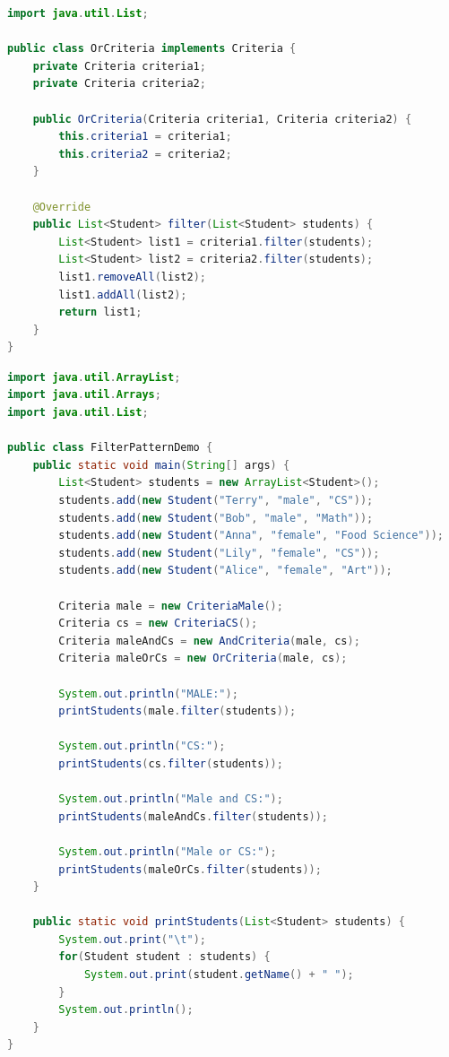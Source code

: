 \begin{lstlisting}[language=Java, title=OrCriteria.java]
import java.util.List;

public class OrCriteria implements Criteria {
    private Criteria criteria1;
    private Criteria criteria2;

    public OrCriteria(Criteria criteria1, Criteria criteria2) {
        this.criteria1 = criteria1;
        this.criteria2 = criteria2;
    }

    @Override
    public List<Student> filter(List<Student> students) {
        List<Student> list1 = criteria1.filter(students);
        List<Student> list2 = criteria2.filter(students);
        list1.removeAll(list2);
        list1.addAll(list2);
        return list1;
    }
}
\end{lstlisting}

\begin{lstlisting}[language=Java, title=FilterPatternDemo.java]
import java.util.ArrayList;
import java.util.Arrays;
import java.util.List;

public class FilterPatternDemo {
    public static void main(String[] args) {
        List<Student> students = new ArrayList<Student>();
        students.add(new Student("Terry", "male", "CS"));
        students.add(new Student("Bob", "male", "Math"));
        students.add(new Student("Anna", "female", "Food Science"));
        students.add(new Student("Lily", "female", "CS"));
        students.add(new Student("Alice", "female", "Art"));

        Criteria male = new CriteriaMale();
        Criteria cs = new CriteriaCS();
        Criteria maleAndCs = new AndCriteria(male, cs);
        Criteria maleOrCs = new OrCriteria(male, cs);

        System.out.println("MALE:");
        printStudents(male.filter(students));

        System.out.println("CS:");
        printStudents(cs.filter(students));

        System.out.println("Male and CS:");
        printStudents(maleAndCs.filter(students));

        System.out.println("Male or CS:");
        printStudents(maleOrCs.filter(students));
    }

    public static void printStudents(List<Student> students) {
        System.out.print("\t");
        for(Student student : students) {
            System.out.print(student.getName() + " ");
        }
        System.out.println();
    }
}  
\end{lstlisting}

